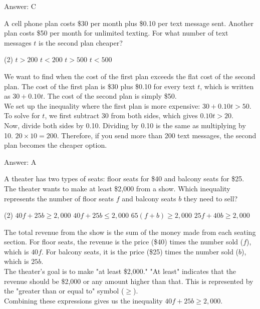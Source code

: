 \documentclass[11pt,paper=a4,answers]{exam}
\begin{document}
\begin{questions}
\begin{solution}
\vspace{15pt}
Answer: \colorbox{yellow!100}{C}
\end{solution}

\question
A cell phone plan costs \$30 per month plus \$0.10 per text message sent. Another plan costs \$50 per month for unlimited texting. For what number of text messages $t$ is the second plan cheaper?
\begin{tasks}(2)
    \task $t > 200$
    \task $t < 200$
    \task $t > 500$
    \task $t < 500$
\end{tasks}

\begin{solution}
We want to find when the cost of the first plan exceeds the flat cost of the second plan. The cost of the first plan is \$30 plus \$0.10 for every text $t$, which is written as $30 + 0.10t$. The cost of the second plan is simply \$50.
\\[10pt]
We set up the inequality where the first plan is more expensive: $30 + 0.10t > 50$. To solve for $t$, we first subtract 30 from both sides, which gives $0.10t > 20$.
\\[10pt]
Now, divide both sides by 0.10. Dividing by 0.10 is the same as multiplying by 10. $20 \times 10 = 200$. Therefore, if you send more than 200 text messages, the second plan becomes the cheaper option.

\vspace{15pt}
Answer: \colorbox{yellow!100}{A}
\end{solution}

\question
A theater has two types of seats: floor seats for \$40 and balcony seats for \$25. The theater wants to make at least \$2,000 from a show. Which inequality represents the number of floor seats $f$ and balcony seats $b$ they need to sell?
\begin{tasks}(2)
    \task $40f + 25b \geq 2,000$
    \task $40f + 25b \leq 2,000$
    \task $65(f + b) \geq 2,000$
    \task $25f + 40b \geq 2,000$
\end{tasks}

\begin{solution}
The total revenue from the show is the sum of the money made from each seating section. For floor seats, the revenue is the price (\$40) times the number sold ($f$), which is $40f$. For balcony seats, it is the price (\$25) times the number sold ($b$), which is $25b$.
\\[10pt]
The theater's goal is to make "at least \$2,000." "At least" indicates that the revenue should be \$2,000 or any amount higher than that. This is represented by the "greater than or equal to" symbol ($\geq$).
\\[10pt]
Combining these expressions gives us the inequality $40f + 25b \geq 2,000$.


\end{solution}
\end{questions}
\end{document}
